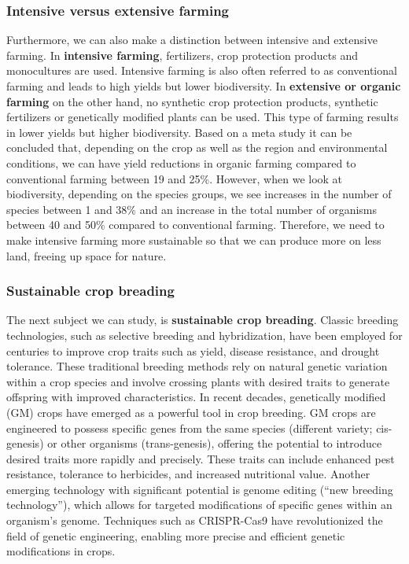 \documentclass[../summary.tex]{subfiles}
\begin{document}
	\subsubsection{Intensive versus extensive farming}
	
	Furthermore, we can also make a distinction between intensive and extensive farming. In \textbf{intensive farming}, fertilizers, crop protection products and monocultures are used. Intensive farming is also often referred to as conventional farming and leads to high yields but lower biodiversity. In \textbf{extensive or organic farming} on the other hand, no synthetic crop protection products, synthetic fertilizers or genetically modified plants can be used. This type of farming results in lower yields but higher biodiversity. Based on a meta study it can be concluded that, depending on the crop as well as the region and environmental conditions, we can have yield reductions in organic farming compared to conventional farming between 19 and 25\%. However, when we look at biodiversity, depending on the species groups, we see increases in the number of species between 1 and 38\% and an increase in the total number of organisms between 40 and 50\% compared to conventional farming. Therefore, we need to make intensive farming more sustainable so that we can produce more on less land, freeing up space for nature.
	
	\newpage
	\subsubsection{Sustainable crop breading}
	
	The next subject we can study, is \textbf{sustainable crop breading}. Classic breeding technologies, such as selective breeding and hybridization, have been employed for centuries to improve crop traits such as yield, disease resistance, and drought tolerance. These traditional breeding methods rely on natural genetic variation within a crop species and involve crossing plants with desired traits to generate offspring with improved characteristics. In recent decades, genetically modified (GM) crops have emerged as a powerful tool in crop breeding. GM crops are engineered to possess specific genes from the same species (different variety; cis-genesis) or other organisms (trans-genesis), offering the potential to introduce desired traits more rapidly and precisely. These traits can include enhanced pest resistance, tolerance to herbicides, and increased nutritional value. Another emerging technology with significant potential is genome editing (“new breeding technology”), which allows for targeted modifications of specific genes within an organism's genome. Techniques such as CRISPR-Cas9 have revolutionized the field of genetic engineering, enabling more precise and efficient genetic modifications in crops. 
	
\end{document}
